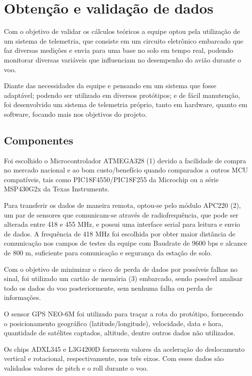 \chapter{Obtenção e validação de dados}\label{dados.cap}

Com o objetivo de validar os cálculos teóricos a equipe optou pela utilização de um
sistema de telemetria, que consiste em um circuito eletrônico embarcado que faz diversas
medições e envia para uma base no solo em tempo real, podendo monitorar diversas variáveis
que influenciam no desempenho do avião durante o voo.

Diante das necessidades da equipe e pensando em um sistema que fosse adaptável;
podendo ser utilizado em diversos protótipos; e de fácil manutenção, foi desenvolvido um
sistema de telemetria próprio, tanto em hardware, quanto em software, focando mais nos
objetivos do projeto.

\section{Componentes}

Foi escolhido o Microcontrolador ATMEGA328 (1) devido a facilidade de compra no
mercado nacional e ao bom custo/benefício quando comparados a outros MCU compatíveis,
tais como PIC18F4550/PIC18F255 da Microchip ou a série MSP430G2x da Texas Instruments.

Para transferir os dados de maneira remota, optou-se pelo módulo APC220 (2), um par
de sensores que comunicam-se através de radiofrequência, que pode ser alterada entre 418 e
455 MHz, e possui uma interface serial para leitura e envio de dados. A frequência de 418 MHz
foi escolhida por obter maior distância de comunicação nos campos de testes da equipe com
Baudrate de 9600 bps e alcance de 800 m, suficiente para comunicação e segurança da estação
de solo.

Com o objetivo de minimizar o risco de perda de dados por possíveis falhas no sinal, foi
utilizado um cartão de memória (3) embarcado, sendo possível analisar todo os dados do voo
posteriormente, sem nenhuma falha ou perda de informações.

O sensor GPS NEO-6M foi utilizado para traçar a rota do protótipo, fornecendo o
posicionamento geográfico (latitude/longitude), velocidade, data e hora, quantidade de satélites
captados, altitude, dentre outros dados não utilizados.

Os chips ADXL345 e L3G4200D fornecem valores da aceleração do deslocamento
vertical e rotacional, respectivamente, nos três eixos. Com esses dados são validados valores de
pitch e o roll durante o voo.

